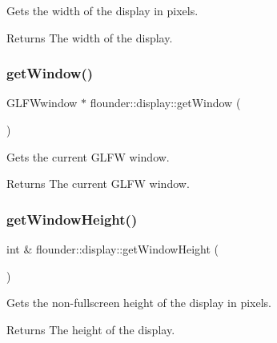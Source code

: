 Gets the width of the display in pixels. 

\begin{DoxyReturn}{Returns}
The width of the display. 
\end{DoxyReturn}
\mbox{\label{classflounder_1_1display_a5cdcd3dddce4cf63ac45503b03e96689}} 
\subsubsection{\texorpdfstring{get\+Window()}{getWindow()}}
{\footnotesize\ttfamily G\+L\+F\+Wwindow $\ast$ flounder\+::display\+::get\+Window (\begin{DoxyParamCaption}{ }\end{DoxyParamCaption})}



Gets the current G\+L\+FW window. 

\begin{DoxyReturn}{Returns}
The current G\+L\+FW window. 
\end{DoxyReturn}
\mbox{\label{classflounder_1_1display_af1d306cb8353a7cdfe7daae4727028fc}} 
\subsubsection{\texorpdfstring{get\+Window\+Height()}{getWindowHeight()}}
{\footnotesize\ttfamily int \& flounder\+::display\+::get\+Window\+Height (\begin{DoxyParamCaption}{ }\end{DoxyParamCaption})}



Gets the non-\/fullscreen height of the display in pixels. 

\begin{DoxyReturn}{Returns}
The height of the display. 
\end{DoxyReturn}
\mbox{\label{classflounder_1_1display_ac47027c6b34d260ccaf148e4e762cdbe}} 
